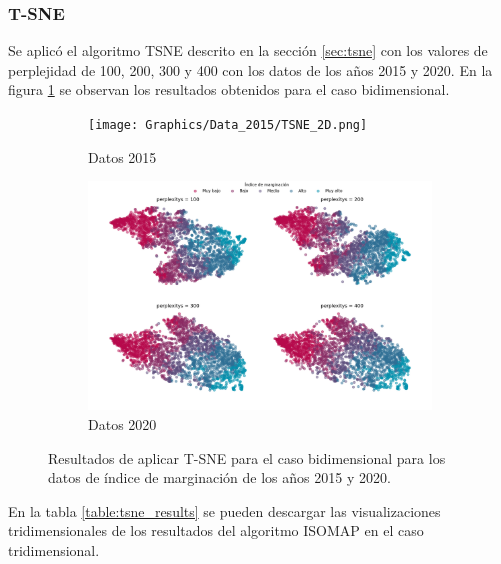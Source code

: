 \pagebreak
\subsubsection{T-SNE}

Se aplicó el algoritmo TSNE descrito en la sección \ref{sec:tsne} con los valores de perplejidad de 100, 200, 300 y 400 con los datos de los años 2015 y 2020. En la figura \ref{fig:tsne_2d} se observan los resultados obtenidos para el caso bidimensional.

\begin{figure}[H]
	\centering
	\begin{subfigure}{8.4cm}
		\texttt{[image: Graphics/Data\_2015/TSNE\_2D.png]}
		\caption{Datos 2015}
	\end{subfigure}
	\begin{subfigure}{8.4cm}
		\includegraphics[width=1\linewidth]{Graphics/Data_2020/TSNE_2D.png}
		\caption{Datos 2020}
	\end{subfigure}
	\caption{Resultados de aplicar T-SNE para el caso bidimensional para los datos de índice de marginación de los años 2015 y 2020.}
	\label{fig:tsne_2d}
\end{figure}

En la tabla \ref{table:tsne_results} se pueden descargar las visualizaciones tridimensionales de los resultados del algoritmo ISOMAP en el caso tridimensional.

